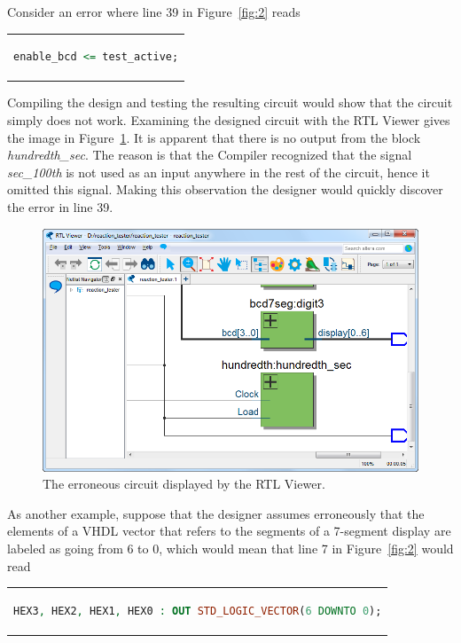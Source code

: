 \documentclass[11pt, twoside, pdftex]{article}
\begin{document}
Consider an error where line 39 in Figure~\ref{fig:2} reads
\begin{center}
\begin{tabular}{c}
\begin{lstlisting}[language=VHDL]
enable_bcd <= test_active;
\end{lstlisting}
\end{tabular} 
\end{center}

\noindent
Compiling the design and testing the resulting circuit would show that the
circuit simply does not work. Examining the designed circuit with the RTL Viewer
gives the image in Figure~\ref{fig:21}. It is apparent that there is no output from
the block {\it hundredth\_sec}. The reason is that the Compiler recognized
that the signal {\it sec\_100th} is not used as an input anywhere in the
rest of the circuit, hence it omitted this signal.
Making this observation the designer would quickly discover the error in line 39.
\begin{figure}[H]
   \begin{center}
      \includegraphics[scale=0.60]{figures/figure21.png}
   \caption{The erroneous circuit displayed by the RTL Viewer.} 
	 \label{fig:21}
	 \end{center}
\end{figure}

As another example, suppose that the designer assumes erroneously that the 
elements of a VHDL vector that refers to the segments of a 7-segment 
display are labeled as going from 6 to 0, which would mean that line 7 in 
Figure~\ref{fig:2} would read 
\begin{center}
\begin{tabular}{c}
\begin{lstlisting}[language=VHDL]
HEX3, HEX2, HEX1, HEX0 : OUT STD_LOGIC_VECTOR(6 DOWNTO 0);
\end{lstlisting}
\end{tabular} 
\end{center}
\end{document}
